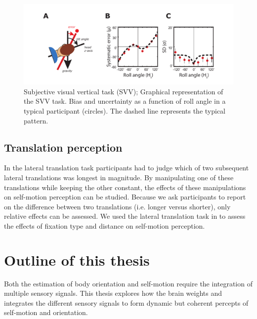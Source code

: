 \begin{figure}
    \includegraphics[width=1.0\textwidth]{src/intro/figures/svv.pdf}

    \caption{Subjective visual vertical task (SVV);  Graphical representation of the SVV task.  Bias and  uncertainty as a function of roll angle in a typical participant (circles). The dashed line represents the typical pattern.}
    \label{intro:fig5}
\end{figure}

\subsection{Translation perception}

In the lateral translation task participants had to judge which of two subsequent lateral translations was longest in magnitude. By manipulating one of these translations while keeping the other constant, the effects of these manipulations on self-motion perception can be studied. Because we ask participants to report on the difference between two translations (i.e. longer versus shorter), only relative effects can be assessed.  We used the lateral translation task in  to assess the effects of fixation type and distance on self-motion perception.


\section{Outline of this thesis}

Both the estimation of body orientation and self-motion require the integration of multiple sensory signals. This thesis explores how the brain weights and integrates the different sensory signals to form dynamic but coherent percepts of self-motion and orientation.

